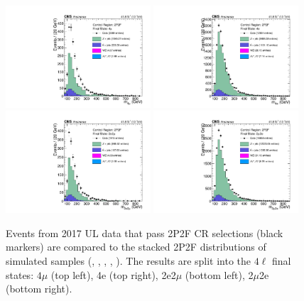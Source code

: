 \begin{figure}[!htbp]
	\begin{center}
		\includegraphics[width=0.48\textwidth]{figures/higgsmassmeas/redbkg/cr/UL2017_CR_2P2F_4mu.pdf}
		\includegraphics[width=0.48\textwidth]{figures/higgsmassmeas/redbkg/cr/UL2017_CR_2P2F_4e.pdf}
		\includegraphics[width=0.48\textwidth]{figures/higgsmassmeas/redbkg/cr/UL2017_CR_2P2F_2e2mu.pdf}
		\includegraphics[width=0.48\textwidth]{figures/higgsmassmeas/redbkg/cr/UL2017_CR_2P2F_2mu2e.pdf}
		\caption{
			Events from 2017 UL data that pass 2P2F CR selections (black markers) 
			are compared to the stacked 2P2F distributions of simulated samples
			(\Zplusjets, \ttbarplusjets, \WZ, \Zgammastar, \ZZ).
			The results are split into the $4\ell$ final states:
			$4\mu$ (top left), 4e (top right), 2e2$\mu$ (bottom left), 2$\mu$2e (bottom right).
		}
		\label{cr_plots_2p2f_2017}
	\end{center}
\end{figure}
